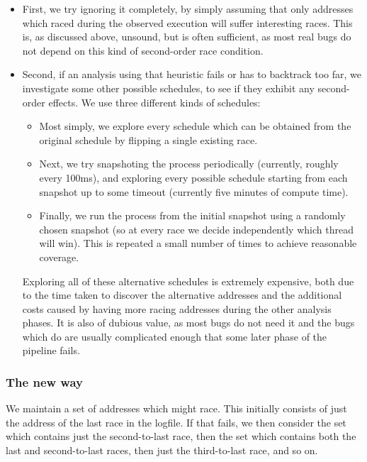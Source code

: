 \documentclass[10pt,a4paper,twocolumn]{article}
\begin{document}
\begin{itemize}
\item First, we try ignoring it completely, by simply assuming that
  only addresses which raced during the observed execution will suffer
  interesting races.  This is, as discussed above, unsound, but is
  often sufficient, as most real bugs do not depend on this kind of
  second-order race condition.

\item Second, if an analysis using that heuristic fails or has to
  backtrack too far, we investigate some other possible schedules, to
  see if they exhibit any second-order effects.  We use three
  different kinds of schedules:

  \begin{itemize}
  \item Most simply, we explore every schedule which can be obtained
    from the original schedule by flipping a single existing race.
  \item Next, we try snapshoting the process periodically (currently,
    roughly every 100ms), and exploring every possible schedule
    starting from each snapshot up to some timeout (currently five
    minutes of compute time).
  \item Finally, we run the process from the initial snapshot using a
    randomly chosen snapshot (so at every race we decide independently
    which thread will win).  This is repeated a small number of times
    to achieve reasonable coverage.
  \end{itemize}
  
  Exploring all of these alternative schedules is extremely expensive,
  both due to the time taken to discover the alternative addresses and
  the additional costs caused by having more racing addresses during
  the other analysis phases.  It is also of dubious value, as most
  bugs do not need it and the bugs which do are usually complicated
  enough that some later phase of the pipeline fails.
\end{itemize}

\subsubsection{The new way}

We maintain a set of addresses which might race.  This initially
consists of just the address of the last race in the logfile.  If that
fails, we then consider the set which contains just the second-to-last
race, then the set which contains both the last and second-to-last
races, then just the third-to-last race, and so on.
\end{document}
